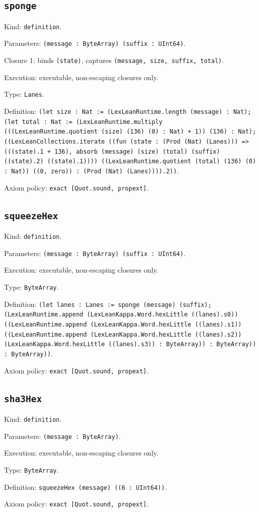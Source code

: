 \documentclass[11pt]{article}
\begin{document}
\subsection*{\texttt{sponge}}
\noindent Kind: \texttt{definition}.\par
\noindent Parameters: \texttt{(message : ByteArray) (suffix : UInt64)}.\par
\noindent Closure 1: binds \texttt{(state)}, captures \texttt{(message, size, suffix, total)}.\par
\noindent Execution: executable, non-escaping closures only.\par
\noindent Type: \texttt{Lanes}.\par
\noindent Definition: \texttt{(let size : Nat := (LexLeanRuntime.length (message) : Nat); (let total : Nat := (LexLeanRuntime.multiply (((LexLeanRuntime.quotient (size) (136) (0) : Nat) + 1)) (136) : Nat); ((LexLeanCollections.iterate ((fun (state : (Prod (Nat) (Lanes))) => (((state).1 + 136), absorb (message) (size) (total) (suffix) ((state).2) ((state).1)))) ((LexLeanRuntime.quotient (total) (136) (0) : Nat)) ((0, zero)) : (Prod (Nat) (Lanes)))).2))}.\par
\noindent Axiom policy: \texttt{exact [Quot.sound, propext]}.\par
\subsection*{\texttt{squeezeHex}}
\noindent Kind: \texttt{definition}.\par
\noindent Parameters: \texttt{(message : ByteArray) (suffix : UInt64)}.\par
\noindent Execution: executable, non-escaping closures only.\par
\noindent Type: \texttt{ByteArray}.\par
\noindent Definition: \texttt{(let lanes : Lanes := sponge (message) (suffix); (LexLeanRuntime.append (LexLeanKappa.Word.hexLittle ((lanes).s0)) ((LexLeanRuntime.append (LexLeanKappa.Word.hexLittle ((lanes).s1)) ((LexLeanRuntime.append (LexLeanKappa.Word.hexLittle ((lanes).s2)) (LexLeanKappa.Word.hexLittle ((lanes).s3)) : ByteArray)) : ByteArray)) : ByteArray))}.\par
\noindent Axiom policy: \texttt{exact [Quot.sound, propext]}.\par
\subsection*{\texttt{sha3Hex}}
\noindent Kind: \texttt{definition}.\par
\noindent Parameters: \texttt{(message : ByteArray)}.\par
\noindent Execution: executable, non-escaping closures only.\par
\noindent Type: \texttt{ByteArray}.\par
\noindent Definition: \texttt{squeezeHex (message) ((6 : UInt64))}.\par
\noindent Axiom policy: \texttt{exact [Quot.sound, propext]}.\par
\end{document}
